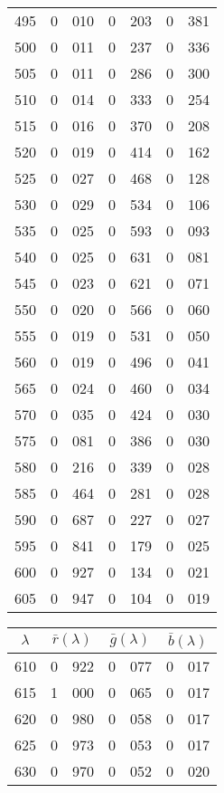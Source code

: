 {{\begin{minipage}{.3\textwidth}
\begin{tabular}{c|r@{.}l | r@{.}l | r@{.}l}
\hline
 495 &   0&010 &   0&203 &   0&381 \\
 500 &   0&011 &   0&237 &   0&336 \\
 505 &   0&011 &   0&286 &   0&300 \\
 510 &   0&014 &   0&333 &   0&254 \\
 515 &   0&016 &   0&370 &   0&208 \\
 520 &   0&019 &   0&414 &   0&162 \\
 525 &   0&027 &   0&468 &   0&128 \\
 530 &   0&029 &   0&534 &   0&106 \\
 535 &   0&025 &   0&593 &   0&093 \\
 540 &   0&025 &   0&631 &   0&081 \\
 545 &   0&023 &   0&621 &   0&071 \\
 550 &   0&020 &   0&566 &   0&060 \\
 555 &   0&019 &   0&531 &   0&050 \\
 560 &   0&019 &   0&496 &   0&041 \\
 565 &   0&024 &   0&460 &   0&034 \\
 570 &   0&035 &   0&424 &   0&030 \\
 575 &   0&081 &   0&386 &   0&030 \\
 580 &   0&216 &   0&339 &   0&028 \\
 585 &   0&464 &   0&281 &   0&028 \\
 590 &   0&687 &   0&227 &   0&027 \\
 595 &   0&841 &   0&179 &   0&025 \\
 600 &   0&927 &   0&134 &   0&021 \\
 605 &   0&947 &   0&104 &   0&019 \\
\end{tabular}
\end{minipage}\hskip3mm
\begin{minipage}{.3\textwidth}
\begin{tabular}{c|r@{.}l | r@{.}l | r@{.}l}
$\lambda$ & \multicolumn{2}{c|}{$\bar r(\lambda)$} &  \multicolumn{2}{c|}{$\bar g(\lambda)$} &  \multicolumn{2}{c}{$\bar b(\lambda)$} \\
\hline
 610 &   0&922 &   0&077 &   0&017 \\
 615 &   1&000 &   0&065 &   0&017 \\
 620 &   0&980 &   0&058 &   0&017 \\
 625 &   0&973 &   0&053 &   0&017 \\
 630 &   0&970 &   0&052 &   0&020 \\

\end{tabular}
\end{minipage}}}

